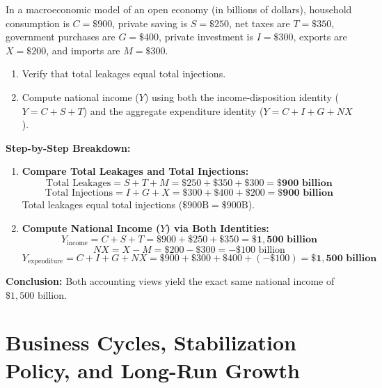 \documentclass[11pt,letterpaper]{article}
\begin{document}
\begin{tcolorbox}[colback=LightSlate,colframe=CourseTeal,title=\textbf{Work It Out: Verifying Leakages, Injections, and National Income}]
In a macroeconomic model of an open economy (in billions of dollars), household consumption is $C = \$900$, private saving is $S = \$250$, net taxes are $T = \$350$, government purchases are $G = \$400$, private investment is $I = \$300$, exports are $X = \$200$, and imports are $M = \$300$.
\begin{enumerate}
    \item Verify that total leakages equal total injections.
    \item Compute national income ($Y$) using both the income-disposition identity ($Y = C + S + T$) and the aggregate expenditure identity ($Y = C + I + G + NX$).
\end{enumerate}

\noindent\textbf{Step-by-Step Breakdown:}
\begin{enumerate}
    \item \textbf{Compare Total Leakages and Total Injections:}
    \[
    \text{Total Leakages} = S + T + M = \$250 + \$350 + \$300 = \mathbf{\$900\text{ billion}}
    \]
    \[
    \text{Total Injections} = I + G + X = \$300 + \$400 + \$200 = \mathbf{\$900\text{ billion}}
    \]
    Total leakages equal total injections ($\$900\text{B} = \$900\text{B}$).

    \item \textbf{Compute National Income ($Y$) via Both Identities:}
    \[
    Y_{\text{income}} = C + S + T = \$900 + \$250 + \$350 = \mathbf{\$1{,}500\text{ billion}}
    \]
    \[
    NX = X - M = \$200 - \$300 = -\$100\text{ billion}
    \]
    \[
    Y_{\text{expenditure}} = C + I + G + NX = \$900 + \$300 + \$400 + (-\$100) = \mathbf{\$1{,}500\text{ billion}}
    \]
\end{enumerate}
\textbf{Conclusion:} Both accounting views yield the exact same national income of $\$1{,}500\text{ billion}$.
\end{tcolorbox}

\section{Business Cycles, Stabilization Policy, and Long-Run Growth}
\end{document}
